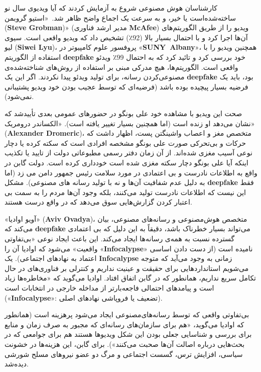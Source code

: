 کارشناسان هوش مصنوعی شروع به آزمایش کردند که آیا ویدیوی سال نو ساخته‌شده‌است یا خیر، و به سرعت یک اجماع واضح ظاهر شد.\ «استیو گروبمن (\textenglish{\textbf{Steve Grobman}})» (مدیر ارشد فناوری \textenglish{\textbf{McAfee}}) ویدیو را از طریق الگوریتم‌های آن‌ها اجرا کرد و با احتمال بسیار بالا (92٪) تشخیص داد که ویدیو واقعی است.
سیوی لیو (\textenglish{\textbf{Siwei Lyu}})، پروفسور علوم کامپیوتر در «\textenglish{\textbf{\mbox{SUNY Albany}}}»، همچنین ویدیو را با استفاده از الگوریتم \textenglish{\textbf{deepfake}} خود بررسی کرد و تائید کرد که به احتمال 99٪ ویدئو واقعی است.
الگوریتم‌ها، هیچ مدرکی مبنی بر استفاده از روش‌های شناخته‌شده‌ی مصنوعی‌کردن رسانه، برای تولید ویدئو پیدا نکردند.
اگر این یک \textenglish{\textbf{deepfake}} بود، باید یک فرضیه بسیار پیچیده بوده باشد (فرضیه‌ای که توسط عجیب بودن خود ویدیو پشتیبانی نمی‌شود).

صحت این ویدیو با مشاهده خود علی بونگو در حضورهای عمومی بعدی تأیید‌شد که نشان می‌دهد او زنده است (اما همچنین بسیار تغییر یافته است).
«الکساندر درومریک» (\textenglish{\textbf{Alexander Dromeric}})، متخصص مغز و اعصاب واشینگتن پست، اظهار داشت که حرکات و بی‌تحرکی صورت علی بونگو مشخصه افرادی است که سکته کرده یا دچار نوعی آسیب مغزی شده‌اند.
از آن زمان دفتر رسمی مطبوعاتی دولت از تایید یا تکذیب اینکه آیا علی بونگو دچار سکته مغزی شده است خودداری کرده است.
دولت گابن در واقع به اطلاعات نادرست و بی اعتمادی در مورد سلامت رئیس جمهور دامن می زد (اما به دلیل عدم شفافیت آن‌ها و نه با تولید رسانه های مصنوعی).
مشکل \textenglish{\textbf{deepfake}} فقط این نیست که اطلاعات نادرست تولید می‌کنند، بلکه وجود آن‌ها مردم را به سمت بی اعتبار کردن گزارش‌هایی سوق می‌دهد که در واقع درست هستند.

«آویو اوادیا» (\textenglish{\textbf{Aviv Ovadya}})، متخصص هوش‌مصنوعی و رسانه‌های مصنوعی، بیان می‌کند که \textenglish{\textbf{deepfake}} می‌تواند بسیار خطرناک باشد، دقیقاً به این دلیل که بی اعتمادی گسترده نسبت به همه‌ی رسانه‌ها ایجاد می‌کند.
این باعث ایجاد نوعی «بی‌تفاوتی واقعیت» می‌شود که اوادیا آن را «\textenglish{\textbf{Infocalypse}}» نامیده است (از دست دادن اساسی اعتماد به نهادهای اجتماعی).
یک \textenglish{\textbf{Infocalypse}} زمانی به وجود می‌آید که متوجه می‌شویم استانداردهایی برای حقیقت و عینیت نداریم و کنترلی بر فناوری‌های در حال تکامل سریع نداریم، همانطور که در گابن اتفاق افتاد.
اوادیا می‌گوید که «مخاطره‌ها زیاد است و پیامدهای احتمالی فاجعه‌بارتر از مداخله خارجی در انتخابات است («\textenglish{\textbf{Infocalypse}}»: تضعیف یا فروپاشی نهادهای اصلی).

بی‌تفاوتی واقعی که توسط رسانه‌های‌مصنوعی ایجاد می‌شود پرهزینه است (همانطور که اوادیا می‌گوید، «هم برای سازمان‌های رسانه‌ای که مجبور به صرف زمان و منابع برای بررسی و شناسایی جعلی بودن این شکل ویدیوها هستند هم برای جوامعی که در بحث‌هایی درباره اصالت آن‌ها صحبت می‌کنند»).
برای گابن، این هزینه‌ها در خشونت سیاسی، افزایش ترس، گسست اجتماعی و مرگ دو عضو نیروهای مسلح شورشی دیده‌شد.
\newline
\newline



